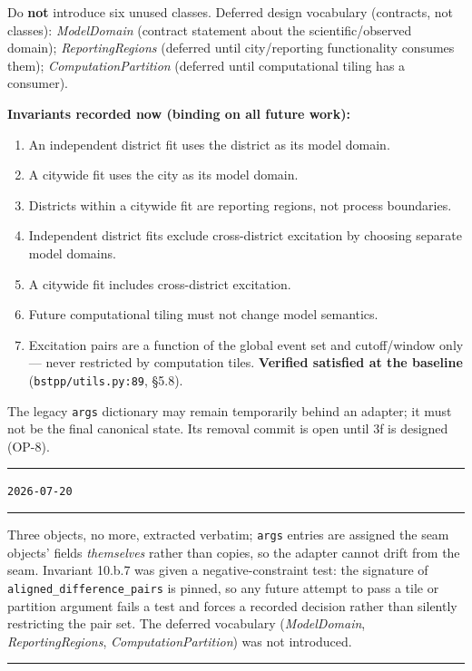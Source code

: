 \documentclass[
  10pt,
]{article}
\providecommand{\tightlist}{%
  \setlength{\itemsep}{0pt}\setlength{\parskip}{0pt}}
\newenvironment{amendment}[2]{%
  \par\medskip\noindent
  {\color{amdcolor}\rule{\linewidth}{1pt}}\par\nobreak
  \vspace{-0.45\baselineskip}
  \noindent{\color{amdcolor}\textbf{#1}}\hfill{\color{amdcolor}\small\texttt{#2}}\par\nobreak
  \vspace{-0.35\baselineskip}
  {\color{amdcolor}\rule{\linewidth}{0.4pt}}\par\nobreak\smallskip
}{%
  \par\nobreak\vspace{-0.25\baselineskip}
  {\color{amdcolor}\rule{\linewidth}{1pt}}\par\medskip
}
\begin{document}
Do \textbf{not} introduce six unused classes. Deferred design vocabulary (contracts, not classes): \emph{ModelDomain} (contract statement about the scientific/observed domain); \emph{ReportingRegions} (deferred until city/reporting functionality consumes them); \emph{ComputationPartition} (deferred until computational tiling has a consumer).

\textbf{Invariants recorded now (binding on all future work):}

\begin{enumerate}
\def\labelenumi{\arabic{enumi}.}
\tightlist
\item
  An independent district fit uses the district as its model domain.
\item
  A citywide fit uses the city as its model domain.
\item
  Districts within a citywide fit are reporting regions, not process boundaries.
\item
  Independent district fits exclude cross-district excitation by choosing separate model domains.
\item
  A citywide fit includes cross-district excitation.
\item
  Future computational tiling must not change model semantics.
\item
  Excitation pairs are a function of the global event set and cutoff/window only --- never restricted by computation tiles. \textbf{Verified satisfied at the baseline} (\texttt{bstpp/utils.py:89}, §5.8).
\end{enumerate}

The legacy \texttt{args} dictionary may remain temporarily behind an adapter; it must not be the final canonical state. Its removal commit is open until 3f is designed (OP-8).

\begin{amendment}{A-4 --- 10.b as implemented}{2026-07-20}
Three objects, no more, extracted verbatim; \texttt{args} entries are assigned the seam objects' fields \emph{themselves} rather than copies, so the adapter cannot drift from the seam. Invariant 10.b.7 was given a negative-constraint test: the signature of \texttt{aligned\_difference\_pairs} is pinned, so any future attempt to pass a tile or partition argument fails a test and forces a recorded decision rather than silently restricting the pair set. The deferred vocabulary (\emph{ModelDomain}, \emph{ReportingRegions}, \emph{ComputationPartition}) was not introduced.
\end{amendment}
\end{document}
